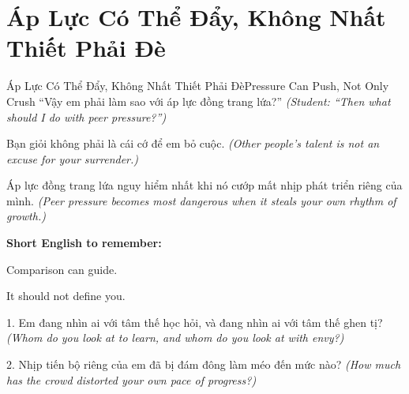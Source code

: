 \section{Áp Lực Có Thể Đẩy, Không Nhất Thiết Phải Đè}
\begin{truyen}{Áp Lực Có Thể Đẩy, Không Nhất Thiết Phải Đè}{Pressure Can Push, Not Only Crush}
 ``Vậy em phải làm sao với áp lực đồng trang lứa?''
\textit{(Student: ``Then what should I do with peer pressure?'')}

\end{truyen}

\begin{baihoc}
Bạn giỏi không phải là cái cớ để em bỏ cuộc.
\textit{(Other people's talent is not an excuse for your surrender.)}

Áp lực đồng trang lứa nguy hiểm nhất khi nó cướp mất nhịp phát triển riêng của mình.
\textit{(Peer pressure becomes most dangerous when it steals your own rhythm of growth.)}
\end{baihoc}

\begin{ghinhoanh}
\textbf{Short English to remember:}

Comparison can guide.

It should not define you.
\end{ghinhoanh}

\begin{tuhocnhanh}
1. Em đang nhìn ai với tâm thế học hỏi, và đang nhìn ai với tâm thế ghen tị? \textit{(Whom do you look at to learn, and whom do you look at with envy?)}

2. Nhịp tiến bộ riêng của em đã bị đám đông làm méo đến mức nào? \textit{(How much has the crowd distorted your own pace of progress?)}
\end{tuhocnhanh}

\ngancach
